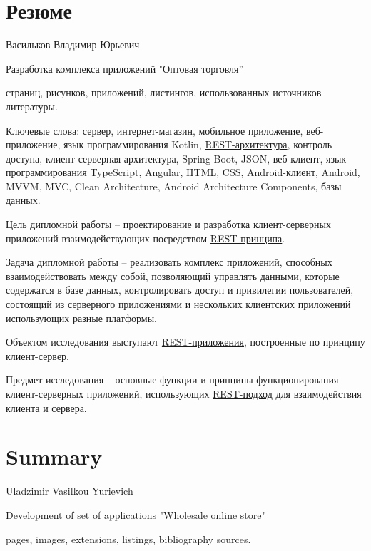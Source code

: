 \pagestyle{empty}
\section*{Резюме}\label{sec:cw-ru}\indent

Васильков Владимир Юрьевич

Разработка комплекса приложений "Оптовая торговля”

\pageref{LastPage} страниц,  рисунков,  приложений,  листингов,  использованных источников литературы.

Ключевые слова: сервер, интернет-магазин, мобильное приложение, веб-приложение, язык программирования Kotlin, \hyperlink{gloss:rest}{REST-архитектура}, 
контроль доступа, клиент-серверная архитектура, Spring Boot, JSON, веб-клиент, язык программирования TypeScript, Angular, HTML, CSS, Android-клиент, 
Android, MVVM, MVC, Clean Architecture, Android Architecture Components, базы данных.

Цель дипломной работы – проектирование и разработка клиент-серверных приложений взаимодействующих посредством \hyperlink{gloss:rest}{REST-принципа}.

Задача дипломной работы – реализовать комплекс приложений, способных взаимодействовать между собой, 
позволяющий управлять данными, которые содержатся в базе данных, контролировать доступ и привилегии пользователей, 
состоящий из серверного приложениями и нескольких клиентских приложений использующих разные платформы.

Объектом исследования выступают \hyperlink{gloss:rest}{REST-приложения}, построенные по принципу клиент-сервер.

Предмет исследования – основные функции и принципы функционирования клиент-серверных приложений, использующих \hyperlink{gloss:rest}{REST-подход} для взаимодействия клиента и сервера.

\section*{Summary}\label{sec:cw-eng}\indent

Uladzimir Vasilkou Yurievich

Development of set of applications "Wholesale online store"

\pageref{LastPage} pages,  images,  extensions,  listings,  bibliography sources.

